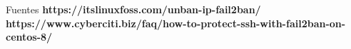 Fuentes \textbf{https://itslinuxfoss.com/unban-ip-fail2ban/} \textbf{https://www.cyberciti.biz/faq/how-to-protect-ssh-with-fail2ban-on-centos-8/}







%



%


